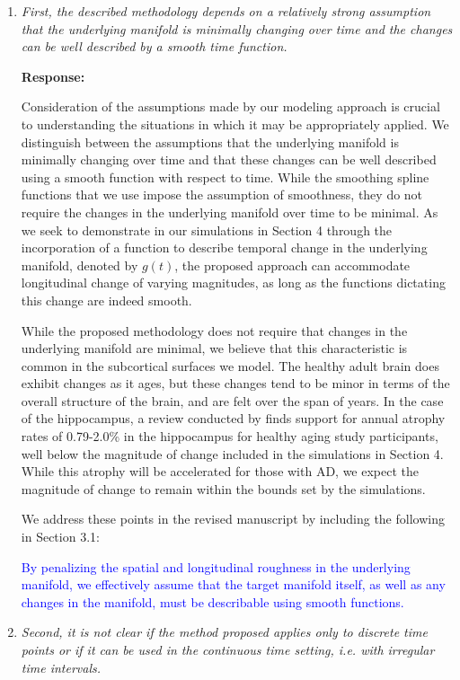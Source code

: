 \documentclass[12pt]{article}
\theoremstyle{definition}
\newcommand{\revision}[1]{\textcolor{blue}{#1}}
\begin{document}
\begin{enumerate}

\item {\it  First, the described methodology depends on a relatively strong assumption that the underlying manifold is minimally changing over time and the changes can be well described by a smooth time function. }

{\bf Response:} 

Consideration of the assumptions made by our modeling approach is crucial to understanding the situations in which it may be appropriately applied. We distinguish between the assumptions that the underlying manifold is minimally changing over time and that these changes can be well described using a smooth function with respect to time. While the smoothing spline functions that we use impose the assumption of smoothness, they do not require the changes in the underlying manifold over time to be minimal. As we seek to demonstrate in our simulations in Section 4 through the incorporation of a function to describe temporal change in the underlying manifold, denoted by $g(t)$, the proposed approach can accommodate longitudinal change of varying magnitudes, as long as the functions dictating this change are indeed smooth.

While the proposed methodology does not require that changes in the underlying manifold are minimal, we believe that this characteristic is common in the subcortical surfaces we model. The healthy adult brain does exhibit changes as it ages, but these changes tend to be minor in terms of the overall structure of the brain,  and are felt over the span of years. In the case of the hippocampus, a review conducted by \citet{fjell2014What} finds support for annual atrophy rates of 0.79-2.0\% in the hippocampus for healthy aging study participants, well below the magnitude of change included in the simulations in Section 4. While this atrophy will be accelerated for those with AD, we expect the magnitude of change to remain within the bounds set by the simulations.

We address these points in the revised manuscript by including the following in Section 3.1:

\revision{By penalizing the spatial and longitudinal roughness in the underlying manifold, we effectively assume that the target manifold itself, as well as any changes in the manifold, must be describable using smooth functions.}

\item {\it Second, it is not clear if the method proposed applies only to discrete time points or if it can be used in the continuous time setting, i.e. with irregular time intervals.}


\end{enumerate}
\end{document}

